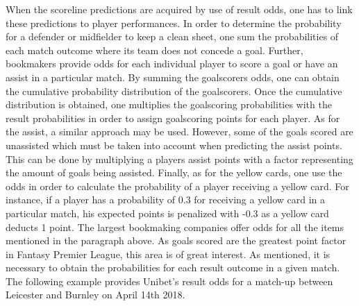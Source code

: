 \newpar

\newpar



\newpar

When the scoreline predictions are acquired by use of result odds, one has to link these predictions to player performances. In order to determine the probability for a defender or midfielder to keep a clean sheet, one sum the probabilities of each match outcome where its team does not concede a goal. Further, bookmakers provide odds for each individual player to score a goal or have an assist in a particular match. By summing the goalscorers odds, one can obtain the cumulative probability distribution of the goalscorers. Once the cumulative distribution is obtained, one multiplies the goalscoring probabilities with the result probabilities in order to assign goalscoring points for each player. As for the assist, a similar approach may be used. However, some of the goals scored are unassisted which must be taken into account when predicting the assist points. This can be done by multiplying a players assist points with a factor representing the amount of goals being assisted. Finally, as for the yellow cards, one use the odds in order to calculate the probability of a player receiving a yellow card. For instance, if a player has a probability of 0.3 for receiving a yellow card in a particular match, his expected points is penalized with -0.3 as a yellow card deducts 1 point. 
\newpar
The largest bookmaking companies offer odds for all the items mentioned in the paragraph above. As goals scored are the greatest point factor in Fantasy Premier League, this area is of great interest. As mentioned, it is necessary to obtain the probabilities for each result outcome in a given match. The following example provides Unibet's result odds for a match-up between Leicester and Burnley on April 14th 2018. 

